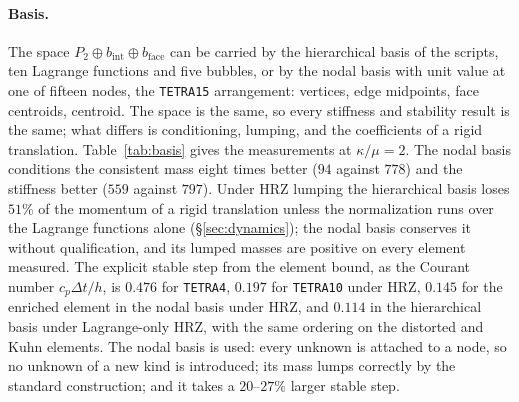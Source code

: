 \documentclass[11pt]{article}
\newcommand{\code}[1]{\texttt{#1}}
\theoremstyle{definition}
\theoremstyle{plain}
\begin{document}
\paragraph{Basis.} The space $P_2 \oplus b_{\mathrm{int}} \oplus
b_{\mathrm{face}}$ can be carried by the hierarchical basis of the scripts,
ten Lagrange functions and five bubbles, or by the nodal basis with unit value
at one of fifteen nodes, the \code{TETRA15} arrangement: vertices, edge
midpoints, face centroids, centroid. The space is the same, so every
stiffness and stability result is the same; what differs is conditioning,
lumping, and the coefficients of a rigid translation. Table~\ref{tab:basis}
gives the measurements at $\kappa/\mu = 2$. The nodal basis conditions the
consistent mass eight times better ($94$ against $778$) and the stiffness
better ($559$ against $797$). Under HRZ lumping the hierarchical basis loses
$51\%$ of the momentum of a rigid translation unless the normalization runs
over the Lagrange functions alone (\S\ref{sec:dynamics}); the nodal basis conserves it without
qualification, and its lumped masses are positive on every element
measured. The explicit stable step from the element bound, as the Courant
number $c_p\Delta t/h$, is $0.476$ for \code{TETRA4}, $0.197$ for
\code{TETRA10} under HRZ, $0.145$ for the enriched element in the nodal
basis under HRZ, and $0.114$ in the hierarchical basis under Lagrange-only
HRZ, with the same ordering on the distorted and Kuhn elements. The nodal
basis is used: every unknown is attached to a node, so no unknown of a new
kind is introduced; its mass lumps correctly by the standard construction;
and it takes a $20$--$27\%$ larger stable step.
\end{document}
